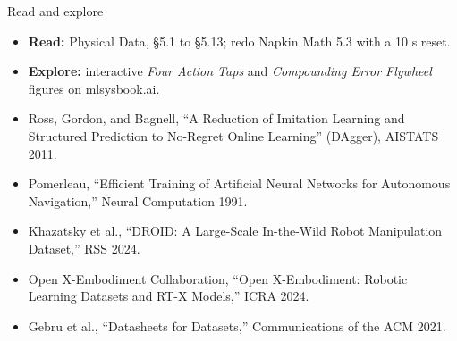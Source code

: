 \documentclass[aspectratio=169, 12pt]{beamer}
\begin{document}
\begin{frame}{Read and explore}
  \footnotesize
  \begin{itemize}\setlength{\itemsep}{0.05cm}
    \item \textbf{Read:} Physical Data, \S5.1 to \S5.13; redo Napkin Math 5.3 with a 10 s reset.
    \item \textbf{Explore:} interactive \emph{Four Action Taps} and \emph{Compounding Error Flywheel} figures on mlsysbook.ai.
    \item Ross, Gordon, and Bagnell, ``A Reduction of Imitation Learning and Structured Prediction to No-Regret Online Learning'' (DAgger), AISTATS 2011.
    \item Pomerleau, ``Efficient Training of Artificial Neural Networks for Autonomous Navigation,'' Neural Computation 1991.
    \item Khazatsky et al., ``DROID: A Large-Scale In-the-Wild Robot Manipulation Dataset,'' RSS 2024.
    \item Open X-Embodiment Collaboration, ``Open X-Embodiment: Robotic Learning Datasets and RT-X Models,'' ICRA 2024.
    \item Gebru et al., ``Datasheets for Datasets,'' Communications of the ACM 2021.
  \end{itemize}
\end{frame}
\end{document}
